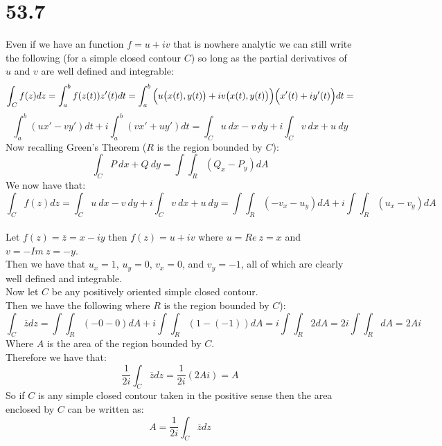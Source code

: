 \documentclass{article}
\begin{document}
\section*{53.7}
\begin{center}
    \doublespacing
    Even if we have an function $f = u + iv$ that is nowhere analytic we can still write the following (for a simple closed contour $C$) so long as the partial derivatives of $u$ and $v$ are well defined and integrable:
    \[\int _C f(z) dz =\int _a^b f(z(t)) z'(t) dt =\int _a^b \Big{(}u\big{(}x(t),y(t)\big{)} + iv\big{(}x(t),y(t)\big{)}\Big{)}\Big{(}x'(t) + iy'(t)\Big{)} dt =\]
    \[\int _a^b (ux' - vy') dt + i\int _a^b (vx' + uy') dt =\int _C u\:dx - v\:dy + i\int _C v\:dx + u\:dy\]
    Now recalling Green's Theorem ($R$ is the region bounded by $C$):
    \[\int _C P\:dx + Q\:dy =\int\int _R (Q_x - P_y) dA\]
    We now have that:
    \[\int _C f(z) dz =\int _C u\:dx - v\:dy + i\int _C v\:dx + u\:dy =\int\int _R (-v_x - u_y) dA + i\int\int _R (u_x - v_y) dA\]
    \break
    \\Let $f(z) =\overline{z} = x - iy$ then $f(z) = u + iv$ where $u = Re\:z = x$ and $v = -Im\:z = -y$.
    \\Then we have that $u_x = 1$, $u_y = 0$, $v_x = 0$, and $v_y = -1$, all of which are clearly well defined and integrable.
    \\Now let $C$ be any positively oriented simple closed contour.
    \\Then we have the following where $R$ is the region bounded by $C$):
    \[\int _C\overline{z} dz =\int\int _R (-0 - 0) dA + i\int\int _R (1 - (-1)) dA = i\int\int _R 2 dA = 2i\int\int _R dA = 2Ai\]
    Where $A$ is the area of the region bounded by $C$.
    \\Therefore we have that:
    \[\frac{1}{2i}\int _C\overline{z} dz =\frac{1}{2i} (2Ai) = A\]
    So if $C$ is any simple closed contour taken in the positive sense then the area enclosed by $C$ can be written as:
    \[A =\frac{1}{2i}\int _C\overline{z} dz\]
    \qedsymbol
\end{center}


\newpage
\end{document}
